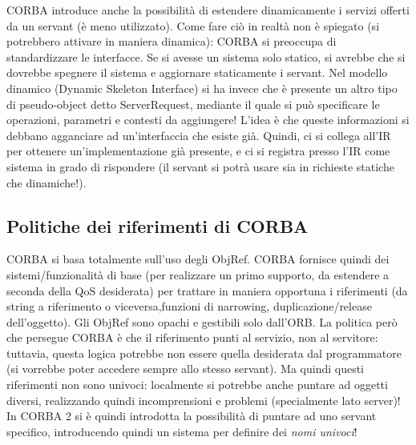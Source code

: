 CORBA introduce anche la possibilità di estendere dinamicamente i servizi offerti da un servant (è meno utilizzato).
Come fare ciò in realtà non è spiegato (si potrebbero attivare in maniera dinamica): CORBA si preoccupa di
standardizzare le interfacce. Se si avesse un sistema solo statico, si avrebbe che si dovrebbe spegnere il sistema e
aggiornare staticamente i servant.
Nel modello dinamico (Dynamic Skeleton Interface) si ha invece che è presente un altro tipo di pseudo-object detto
ServerRequest, mediante il quale si può specificare le operazioni, parametri e contesti da aggiungere! L'idea è che
queste informazioni si debbano agganciare ad un'interfaccia che esiste già. Quindi, ci si collega all'IR per ottenere
un'implementazione già presente, e ci si registra presso l'IR come sistema in grado di rispondere (il servant si potrà
usare sia in richieste statiche che dinamiche!).
\subsection{Politiche dei riferimenti di CORBA}
CORBA si basa totalmente sull'uso degli ObjRef. CORBA fornisce quindi dei sistemi/funzionalità di base (per realizzare
un primo supporto, da estendere a seconda della QoS desiderata) per trattare in maniera opportuna i riferimenti
(da string a riferimento o viceversa,funzioni di narrowing, duplicazione/release dell'oggetto). Gli ObjRef sono opachi e gestibili solo dall'ORB.
La politica però che persegue CORBA è che il riferimento punti al servizio, non al servitore: tuttavia, questa logica
potrebbe non essere quella desiderata dal programmatore (si vorrebbe poter accedere sempre allo stesso servant). Ma quindi questi riferimenti non sono univoci: localmente si potrebbe anche puntare ad oggetti diversi,
realizzando quindi incomprensioni e problemi (specialmente lato server)!
In CORBA 2 si è quindi introdotta la possibilità di puntare ad uno servant specifico, introducendo quindi un sistema per
definire dei \textit{nomi univoci}!
